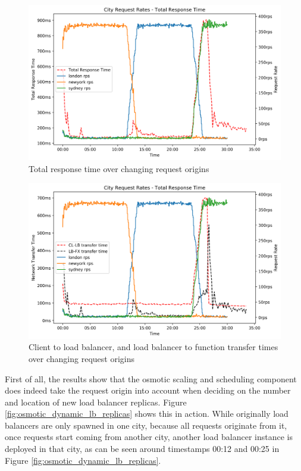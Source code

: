 \begin{figure}
    \centering
    \includegraphics[width=14cm]{graphics/graphs/osmotic_dynamc_region_rps_trt_corrected.png}
    \caption{Total response time over changing request origins}
    \label{fig:osmotic_dynamic_trt}
\end{figure}

\begin{figure}
    \centering
    \includegraphics[width=14cm]{graphics/graphs/osmotic_dynamic_region_tx_times_corrected.png}
    \caption{Client to load balancer, and load balancer to function transfer times over changing request origins}
    \label{fig:osmotic_dynamic_tx}
\end{figure}

First of all, the results show that the osmotic scaling and scheduling component does indeed take the request origin into account when deciding on the number and location of new load balancer replicas.
Figure \ref{fig:osmotic_dynamic_lb_replicas} shows this in action.
While originally load balancers are only spawned in one city, because all requests originate from it, once requests start coming from another city, another load balancer instance is deployed in that city, as can be seen around timestamps 00:12 and 00:25 in Figure \ref{fig:osmotic_dynamic_lb_replicas}.


